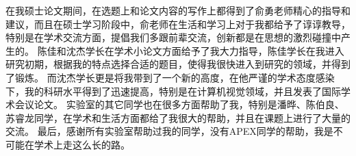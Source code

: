 
\begin{thanks}
在我硕士论文期间，在选题上和论文内容的写作上都得到了俞勇老师精心的指导和建议，而且在硕士学习阶段中，俞老师在生活和学习上对于我都给予了谆谆教导，
特别是在学术交流方面，提倡我们多跟前辈交流，创新都是在思想的激烈碰撞中产生的。
陈佳和沈杰学长在学术小论文方面给予了我大力指导，陈佳学长在我进入研究初期，根据我的特点选择合适的题目，使得我很快进入到研究的领域，并得到了锻炼。
而沈杰学长更是将我带到了一个新的高度，在他严谨的学术态度感染下，我的科研水平得到了迅速提高，特别是在计算机视觉领域，并且发表了国际学术会议论文。
实验室的其它同学也在很多方面帮助了我，特别是潘晔、陈伯良、苏睿龙同学，在学术和生活方面都给了我很大的帮助，并且在课题上进行了大量的交流。
最后，感谢所有实验室帮助过我的同学，没有APEX同学的帮助，我是不可能在学术上走这么长的路。
\end{thanks}
